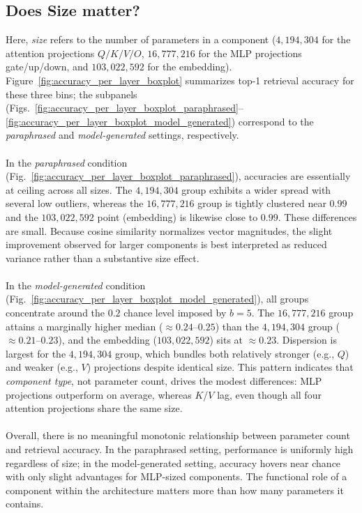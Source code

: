 \subsection{Does Size matter?}
Here, \emph{size} refers to the number of parameters in a component ($4{,}194{,}304$ for the attention projections $Q/K/V/O$,
$16{,}777{,}216$ for the MLP projections gate/up/down, and $103{,}022{,}592$ for the embedding).  Figure~\ref{fig:accuracy_per_layer_boxplot} summarizes top-1 retrieval accuracy for these three bins; the subpanels
(Figs.~\ref{fig:accuracy_per_layer_boxplot_paraphrased}–\ref{fig:accuracy_per_layer_boxplot_model_generated}) correspond to the \emph{paraphrased} and \emph{model-generated} settings, respectively.
\\\\
In the \emph{paraphrased} condition (Fig.~\ref{fig:accuracy_per_layer_boxplot_paraphrased}), accuracies are essentially at ceiling across all sizes. The $4{,}194{,}304$ group exhibits a wider spread with several low outliers, whereas the $16{,}777{,}216$ group is tightly clustered near $0.99$ and the $103{,}022{,}592$ point (embedding) is likewise close to $0.99$. These differences are small. Because cosine similarity normalizes vector magnitudes, the slight improvement observed for larger components is best interpreted as reduced variance rather than a substantive size effect.
\\\\
In the \emph{model-generated} condition
(Fig.~\ref{fig:accuracy_per_layer_boxplot_model_generated}), all groups concentrate around the $0.2$ chance level imposed by $b{=}5$. The $16{,}777{,}216$ group attains a marginally higher median ($\approx 0.24$–$0.25$) than the $4{,}194{,}304$ group
($\approx 0.21$–$0.23$), and the embedding ($103{,}022{,}592$) sits at $\approx 0.23$. Dispersion is largest for the $4{,}194{,}304$ group, which bundles both relatively stronger (e.g., $Q$) and weaker (e.g., $V$) projections despite identical size. This pattern indicates that \emph{component type}, not parameter count, drives the modest differences: MLP projections outperform on average, whereas $K$/$V$ lag, even though all four attention projections share the same size.
\\\\
Overall, there is no meaningful monotonic relationship between parameter count and retrieval accuracy. In the paraphrased setting, performance is uniformly high regardless of size; in the model-generated setting, accuracy
hovers near chance with only slight advantages for MLP-sized components. The functional role of a component within the architecture matters more than how many parameters it contains.
